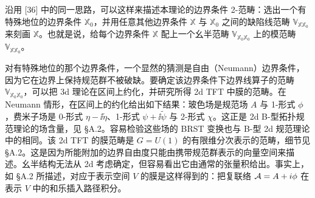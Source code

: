 
沿用 [36] 中的同一思路，可以这样来描述本理论的边界条件 2-范畴：选出一个有特殊地位的边界条件 $\mathbb{X}_0$，并用任意其他边界条件 $\mathbb{X}$ 与 $\mathbb{X}_0$ 之间的缺陷线范畴 $\mathbb{V}_{\mathbb{X}\mathbb{X}_0}$ 来刻画 $\mathbb{X}$。也就是说，给每个边界条件 $\mathbb{X}$ 配上一个幺半范畴 $\mathbb{V}_{\mathbb{X}_0\mathbb{X}_0}$ 上的模范畴 $\mathbb{V}_{\mathbb{X}\mathbb{X}_0}$。

对有特殊地位的那个边界条件，一个显然的猜测是自由（Neumann）边界条件，因为它在边界上保持规范群不被破缺。要确定该边界条件下边界线算子的范畴 $\mathbb{V}_{\mathbb{X}_0\mathbb{X}_0}$，可以把 3d 理论在区间上约化，并研究所得 2d TFT 中膜的范畴。在 Neumann 情形，在区间上的约化给出如下结果：玻色场是规范场 $A$ 与 1-形式 $\phi$，费米子场是 0-形式 $\eta-\ii\tilde\eta$、1-形式 $\psi+\ii\tilde\psi$ 与 2-形式 $\chi$。这正是 2d B-型拓扑规范理论的场含量，见 §A.2。容易检验这些场的 BRST 变换也与 B-型 2d 规范理论中的相同。该 2d TFT 的膜范畴是 $G=U(1)$ 的有限维分次表示的范畴，细节见 §A.2。这是因为所能附加的边界自由度只能由携带规范群表示的向量空间来描述。幺半结构无法从 2d 考虑确定，但容易看出它由通常的张量积给出。事实上，如 §A.2 所描述，对应于表示空间 $V$ 的膜是这样得到的：把复联络 $\mathcal{A}=A+i\phi$ 在表示 $V$ 中的和乐插入路径积分。
